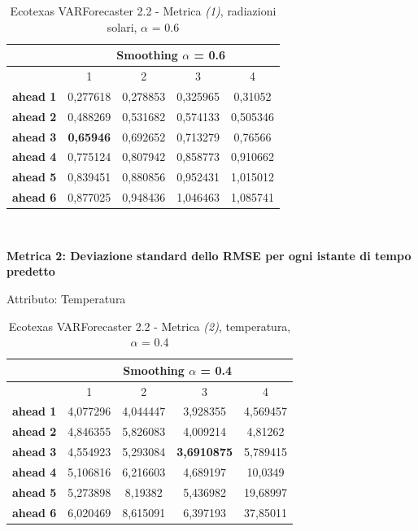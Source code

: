 \documentclass[12pt,a4paper,oneside,openright]{book}
\begin{document}
\medskip

\begin{table}[H]
\centering
\begin{tabular}{|c|c|c|c|c|}
\hline
 & \multicolumn{4}{|c|}{Smoothing $\alpha$ = 0.6} \\
\hline
& 1 & 2 & 3 & 4 \\
\hline
\textbf{ahead 1} & 0,277618 & 0,278853 & 0,325965 & 0,31052\\
\hline
\textbf{ahead 2} & 0,488269 & 0,531682 & 0,574133 & 0,505346\\ 
\hline
\textbf{ahead 3} & \textbf{0,65946} & 0,692652 & 0,713279 & 0,76566\\
\hline
\textbf{ahead 4} & 0,775124 & 0,807942 & 0,858773 & 0,910662\\ 
\hline
\textbf{ahead 5} & 0,839451 & 0,880856 & 0,952431 & 1,015012\\
\hline
\textbf{ahead 6} & 0,877025 & 0,948436 & 1,046463 & 1,085741\\ 
\hline
\end{tabular} \\
\caption{Ecotexas VARForecaster 2.2 - Metrica \textit{(1)}, radiazioni solari, $\alpha$ = 0.6}
\end{table} 
\newpage

\textbf{Metrica 2: Deviazione standard dello RMSE per ogni istante di tempo predetto}

\medskip

Attributo: Temperatura \\

\begin{table}[H]
\centering
\begin{tabular}{|c|c|c|c|c|}
\hline
 & \multicolumn{4}{|c|}{Smoothing $\alpha$ = 0.4} \\
\hline
& 1 & 2 & 3 & 4 \\
\hline
\textbf{ahead 1} & 4,077296 & 4,044447 & 3,928355 & 4,569457\\
\hline
\textbf{ahead 2} & 4,846355 & 5,826083 & 4,009214 & 4,81262\\ 
\hline
\textbf{ahead 3} & 4,554923 & 5,293084 & \textbf{3,6910875} & 5,789415\\
\hline
\textbf{ahead 4} & 5,106816 & 6,216603 & 4,689197 & 10,0349\\ 
\hline
\textbf{ahead 5} & 5,273898 & 8,19382 & 5,436982 & 19,68997\\
\hline
\textbf{ahead 6} & 6,020469 & 8,615091 & 6,397193 & 37,85011\\ 
\hline
\end{tabular} \\
\caption{Ecotexas VARForecaster 2.2 - Metrica \textit{(2)}, temperatura, $\alpha$ = 0.4}
\end{table} 
\end{document}
